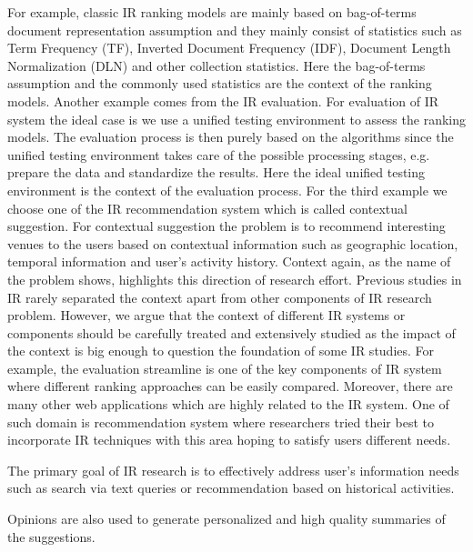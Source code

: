 For example, classic IR ranking models are mainly based on 
bag-of-terms document representation assumption and they mainly 
consist of statistics such as Term Frequency (TF), 
Inverted Document Frequency (IDF), 
Document Length Normalization (DLN) and other collection statistics. 
Here the bag-of-terms assumption 
and the commonly used statistics are the context of the ranking models. 
Another example comes from the IR evaluation. 
For evaluation of IR system the ideal case is we use a unified testing 
environment to assess the ranking models. 
The evaluation process is then purely based on the algorithms since the 
unified testing environment takes care of the possible processing stages, 
e.g. prepare the data and standardize the results. 
Here the ideal unified testing environment is the context of the evaluation 
process. 
For the third example we choose one of the IR recommendation system which is 
called contextual suggestion. For contextual suggestion the problem is to 
recommend interesting venues to the users based on contextual information 
such as geographic location, temporal information and user's activity history. 
Context again, as the name of the problem shows, highlights this direction 
of research effort. 
Previous studies in IR rarely separated the context apart from other 
components of IR research problem. However, we argue that the context of 
different IR systems or components should be carefully treated and extensively 
studied as the impact of the context is big enough to question the foundation 
of some IR studies.
For example, the evaluation streamline is one of the key 
components of IR system where different ranking approaches can be 
easily compared. Moreover, there are many other web applications which 
are highly related to the IR system. One of such domain is recommendation 
system where researchers tried their best to incorporate IR techniques 
with this area hoping to satisfy users different needs.


The primary goal of IR research is to effectively address user's 
information needs such as search via text queries or recommendation 
based on historical activities. 

Opinions are also used to generate personalized and high 
quality summaries of the suggestions. 